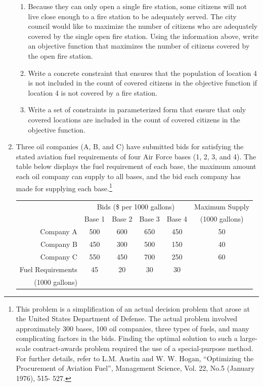 \documentclass[letterpaper,oneside,12pt]{article}%
\begin{document}
\begin{enumerate}
\begin{enumerate}
\item  Because they can only open a single fire station, some citizens will not live close enough to a fire station to be adequately served.  The city council would like to maximize the number of citizens who are adequately covered by the single open fire station.  Using the information above, write an objective function that maximizes the number of citizens covered by the open fire station.

\item  Write a concrete constraint that ensures that the population of location 4 is not included in the count of covered citizens in the objective function if location 4 is not covered by a fire station.

\item  Write a set of constraints in parameterized form that ensure that only covered locations are included in the count of covered citizens in the objective function.


\end{enumerate}

\newpage

\item Three oil companies (A, B, and C) have submitted bids for satisfying the stated
aviation fuel requirements of four Air Force bases (1, 2, 3, and 4). The table
below displays the fuel requirement of each base, the maximum amount each oil
company can supply to all bases, and the bid each company has made for
supplying each base.\footnote{This problem is a simplification of an actual decision problem
that arose at the United States Department of Defense. The actual problem
involved approximately 300 bases, 100 oil companies, three types of fuels, and
many complicating factors in the bids. Finding the optimal solution to such a
large-scale contract-awards problem required the use of a special-purpose
method. For further details, refer to L.M. Austin and W. W. Hogan, ``Optimizing
the Procurement of Aviation Fuel'', Management Science, Vol. 22, No.5 (January
1976), 515- 527.}

\begin{center}\begin{tabular}{|r|cccc|c|}\hline
    & \multicolumn{4}{c|}{Bids (\$ per 1000 gallons)} & Maximum Supply \\\cline{2-5}
    & Base 1 & Base 2 & Base 3 & Base 4 & (1000 gallons) \\\hline
  Company A & 500 & 600 & 650 & 450 & 50 \\
  Company B & 450 & 300 & 500 & 150 & 40 \\
  Company C & 550 & 450 & 700 & 250 & 60 \\\hline
  Fuel Requirements & 45 & 20 & 30 & 30 & \\
  (1000 gallons) &  &  &  &  & \\\hline
\end{tabular}\end{center}


\end{enumerate}
\end{document}
